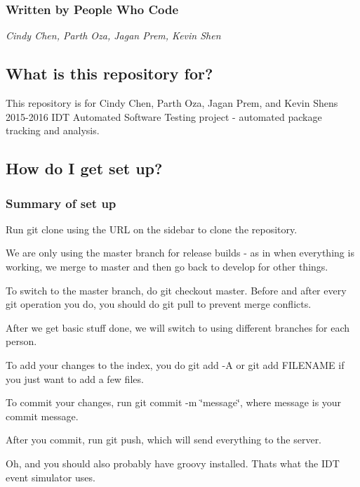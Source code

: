 \subsubsection*{Written by People Who Code}

{\itshape  Cindy Chen, Parth Oza, Jagan Prem, Kevin Shen }

\subsection*{What is this repository for?}

This repository is for Cindy Chen, Parth Oza, Jagan Prem, and Kevin Shen\textquotesingle{}s 2015-\/2016 I\+DT Automated Software Testing project -\/ automated package tracking and analysis.

\subsection*{How do I get set up?}

\subsubsection*{Summary of set up}

Run {\ttfamily git clone} using the U\+RL on the sidebar to clone the repository.

We are only using the {\ttfamily master} branch for release builds -\/ as in when everything is working, we merge to master and then go back to develop for other things.

To switch to the {\ttfamily master} branch, do {\ttfamily git checkout master}. Before and after every {\ttfamily git} operation you do, you should do {\ttfamily git pull} to prevent merge conflicts.

After we get basic stuff done, we will switch to using different branches for each person.

To add your changes to the {\ttfamily index}, you do {\ttfamily git add -\/A} or {\ttfamily git add F\+I\+L\+E\+N\+A\+ME} if you just want to add a few files.

To commit your changes, run {\ttfamily git commit -\/m \char`\"{}message\char`\"{}}, where message is your commit message.

After you commit, run {\ttfamily git push}, which will send everything to the server.

Oh, and you should also probably have {\ttfamily groovy} installed. That\textquotesingle{}s what the I\+DT event simulator uses.

